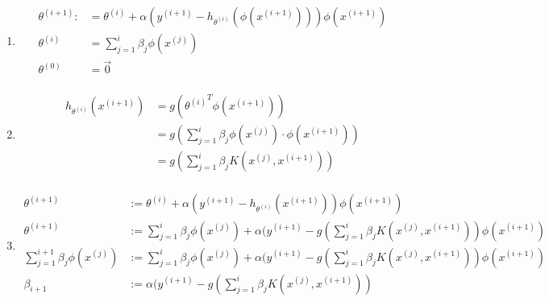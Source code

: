 \begin{answer}
    \begin{enumerate}
        \item 
        $$
        \begin{aligned}
            \theta^{(i+1)} :&=\theta^{(i)} + \alpha \left(y^{(i+1)} - h_{\theta^{(i)}}(\phi(x^{(i+1)}))\right) \phi(x^{(i+1)})\\
            \theta^{(i)} &= \sum_{j = 1}^i\beta_j\phi(x^{(j)}) \\
            \theta^{(0)} &= \vec{0} \\
        \end{aligned}
        $$
        \item 
        $$
        \begin{aligned}
            h_{\theta^{(i)}}(x^{(i+1)}) &= g\left({\theta^{(i)}}^T \phi(x^{(i+1)})\right)\\
            &= g\left( \sum_{j = 1}^i\beta_j\phi(x^{(j)}) \cdot \phi(x^{(i+1)}) \right) \\
            &= g\left( \sum_{j = 1}^i\beta_j K(x^{(j)}, x^{(i+1)})\right) \\
        \end{aligned}
        $$
        \item 
        $$
        \begin{aligned}
            \theta^{(i+1)} &:= \theta^{(i)} + \alpha (y^{(i+1)} - h_{\theta^{(i)}}(x^{(i+1)})) \phi(x^{(i+1)})         \\
            \theta^{(i+1)} &:= \sum_{j = 1}^i\beta_j\phi(x^{(j)}) + \alpha (y^{(i+1)} - g( \sum_{j = 1}^i\beta_j K(x^{(j)}, x^{(i+1)})) \phi(x^{(i+1)})         \\
            \sum_{j = 1}^{i+1}\beta_j\phi(x^{(j)}) &:= \sum_{j = 1}^i\beta_j\phi(x^{(j)}) + \alpha (y^{(i+1)} - g( \sum_{j = 1}^i\beta_j K(x^{(j)}, x^{(i+1)})) \phi(x^{(i+1)})         \\
            \beta_{i+1} &:= \alpha (y^{(i+1)} - g( \sum_{j = 1}^i\beta_j K(x^{(j)}, x^{(i+1)}))       \\
        \end{aligned}
        $$
    \end{enumerate}
\end{answer}
